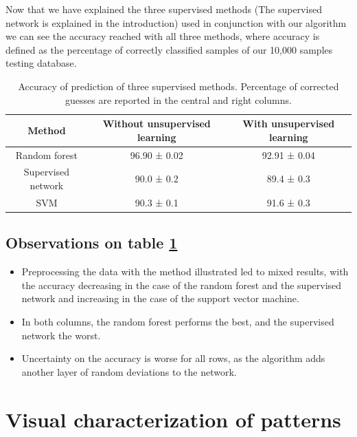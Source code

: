 \documentclass[a4paper]{report}
\begin{document}
Now that we have explained the three supervised methods (The supervised network is explained in the introduction) used in conjunction with our algorithm we can see the accuracy reached with all three methods, where accuracy is defined as the percentage of correctly classified samples of our 10,000 samples testing database.

\begin{table}[h!]
  \begin{center}
    \caption{Accuracy of prediction of three supervised methods. Percentage of corrected guesses are reported in the central and right columns.}
    \begin{tabular}{c|c|c} %
      \textbf{Method} & \textbf{Without unsupervised learning} & \textbf{With unsupervised learning}\\
      \hline
      Random forest & 96.90  ± 0.02 & 92.91 ± 0.04\\
      Supervised network & 90.0 ± 0.2 & 89.4 ± 0.3 \\
      SVM & 90.3 ± 0.1 & 91.6 ± 0.3 \\
    \end{tabular}
    \label{bbb}
  \end{center}
\end{table}

\subsection{Observations on table \ref{bbb}}

\begin{itemize}
    \item Preprocessing the data with the method illustrated led to mixed results, with the accuracy decreasing in the case of the random forest and the supervised network and increasing in the case of the support vector machine.
    \item In both columns, the random forest performs the best, and the supervised network the worst.
    \item Uncertainty on the accuracy is worse for all rows, as the algorithm adds another layer of random deviations to the network.
\end{itemize}

\section{Visual characterization of patterns}
\end{document}

